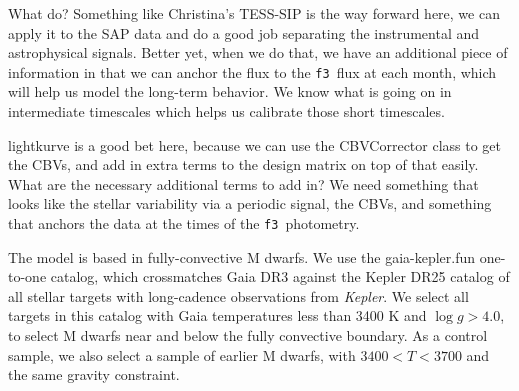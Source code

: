 \documentclass[twocolumn,dvipsnames]{aastex631}
\newcommand{\kepler}{\textit{Kepler}\xspace}
\newcommand{\logg}{$\log g$\xspace}
\newcommand{\fthree}{\texttt{f3}}
\begin{document}
What do? Something like Christina's TESS-SIP is the way forward here, we can apply it to the SAP data and do a good job separating the instrumental and astrophysical signals. Better yet, when we do that, we have an additional piece of information in that we can anchor the flux to the \fthree\ flux at each month, which will help us model the long-term behavior. We know what is going on in intermediate timescales which helps us calibrate those short timescales.

lightkurve is a good bet here, because we can use the CBVCorrector class to get the CBVs, and add in extra terms to the design matrix on top of that easily. What are the necessary additional terms to add in? We need something that looks like the stellar variability via a periodic signal, the CBVs, and something that anchors the data at the times of the \fthree\ photometry. 



The \citet{Brown21} model is based in fully-convective M dwarfs. We use the gaia-kepler.fun one-to-one catalog, which crossmatches Gaia DR3 against the Kepler DR25 catalog of all stellar targets with long-cadence observations from \kepler. We select all targets in this catalog with Gaia temperatures less than 3400 K and \logg $> 4.0$, to select M dwarfs near and below the fully convective boundary. As a control sample, we also select a sample of earlier M dwarfs, with $3400 < T < 3700$ and the same gravity constraint.


{}

\end{document}
